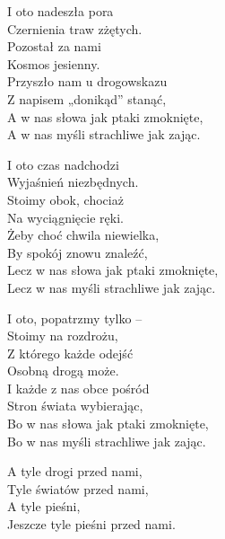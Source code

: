 \begin{text}
    I oto nadeszła pora\\
    Czernienia traw zżętych.\\
    Pozostał za nami\\
    Kosmos jesienny.\\
    Przyszło nam u drogowskazu\\
    Z napisem „donikąd” stanąć,\\
    A w nas słowa jak ptaki zmoknięte,\\
    A w nas myśli strachliwe jak zając.

    I oto czas nadchodzi\\
    Wyjaśnień niezbędnych.\\
    Stoimy obok, chociaż\\
    Na wyciągnięcie ręki.\\
    Żeby choć chwila niewielka,\\
    By spokój znowu znaleźć,\\
    Lecz w nas słowa jak ptaki zmoknięte,\\
    Lecz w nas myśli strachliwe jak zając.

    I oto, popatrzmy tylko –\\
    Stoimy na rozdrożu,\\
    Z którego każde odejść\\
    Osobną drogą może.\\
    I każde z nas obce pośród\\
    Stron świata wybierając,\\
    Bo w nas słowa jak ptaki zmoknięte,\\
    Bo w nas myśli strachliwe jak zając.

    A tyle drogi przed nami,\\
    Tyle światów przed nami,\\
    A tyle pieśni,\\
    Jeszcze tyle pieśni przed nami.
\end{text}
\begin{chord}

\end{chord}